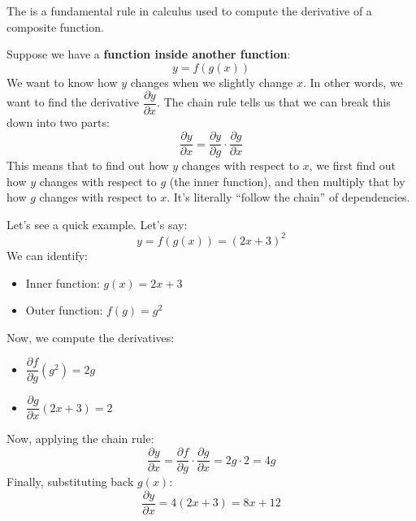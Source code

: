 \highspace
\begin{remarkbox}\label{box:chain-rule}
    The  is a fundamental rule in calculus used to compute the derivative of a composite function.

    Suppose we have a \textbf{function inside another function}:
    \begin{equation*}
        y = f\left(g(x)\right)
    \end{equation*}
    We want to know how $y$ changes when we slightly change $x$. In other words, we want to find the derivative $\dfrac{\partial y}{\partial x}$. The chain rule tells us that we can break this down into two parts:
    \begin{equation}
        \dfrac{\partial y}{\partial x} = \dfrac{\partial y}{\partial g} \cdot \dfrac{\partial g}{\partial x}
    \end{equation}
    This means that to find out how $y$ changes with respect to $x$, we first find out how $y$ changes with respect to $g$ (the inner function), and then multiply that by how $g$ changes with respect to $x$. It's literally ``follow the chain'' of dependencies.

    Let's see a quick example. Let's say:
    \begin{equation*}
        y = f\left(g(x)\right) = \left(2x + 3\right)^{2}
    \end{equation*}
    We can identify:
    \begin{itemize}
        \item Inner function: $g(x) = 2x + 3$
        \item Outer function: $f(g) = g^{2}$
    \end{itemize}
    Now, we compute the derivatives:
    \begin{itemize}
        \item $\dfrac{\partial f}{\partial g} \left(g^{2}\right) = 2g$
        \item $\dfrac{\partial g}{\partial x} \left(2x + 3\right) = 2$
    \end{itemize}
    Now, applying the chain rule:
    \begin{equation*}
        \dfrac{\partial y}{\partial x} = \dfrac{\partial f}{\partial g} \cdot \dfrac{\partial g}{\partial x} = 2g \cdot 2 = 4g
    \end{equation*}
    Finally, substituting back $g(x)$:
    \begin{equation*}
        \dfrac{\partial y}{\partial x} = 4(2x + 3) = 8x + 12
    \end{equation*}
\end{remarkbox}

